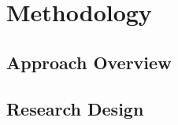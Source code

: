 ﻿\chapter{Methodology}

\section{Approach Overview}
\label{sec:method_overview}


\section{Research Design}
\label{sec:research_design}

